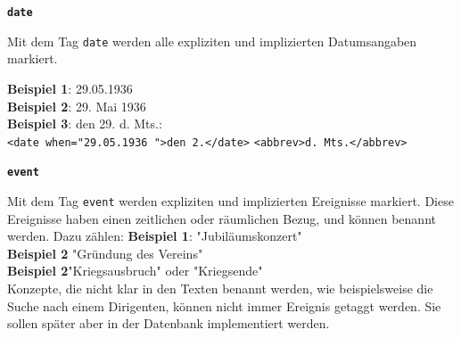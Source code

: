 \documentclass[12pt, a4paper, ngerman, bidi=default]{article}
\begin{document}
\begin{description}
    \item \textbf{\colorbox{date}{\texttt{date}}}
        
    Mit dem Tag \texttt{\colorbox{date}{date}} werden alle expliziten und implizierten Datumsangaben markiert.  
    
    \noindent \textbf{ Beispiel 1}:  29.05.1936  \\
    \textbf{ Beispiel 2}: 29. Mai 1936 \\
    \textbf{ Beispiel 3}: den 29. d. Mts.:\\
    \colorbox{VeryLightGray}{\texttt{\textless date when="29.05.1936 "\textgreater den 2.\textless /date\textgreater} \texttt{\textless abbrev\textgreater d. Mts.\textless /abbrev\textgreater}}

    \item \textbf{\colorbox{eventTag}{\texttt{event}}}
    
    Mit dem Tag \texttt{\colorbox{eventTag}{event}} werden expliziten und implizierten Ereignisse markiert. Diese Ereignisse haben einen zeitlichen oder räumlichen Bezug, und können benannt werden. Dazu zählen:
    \noindent \textbf{ Beispiel 1}: "Jubiläumskonzert"\\
    \textbf{ Beispiel 2} "Gründung des Vereins" \\ 
    \textbf{ Beispiel 2}"Kriegsausbruch" oder "Kriegsende"\\

    Konzepte, die nicht klar in den Texten benannt werden, wie beispielsweise die Suche nach einem Dirigenten, können nicht immer Ereignis getaggt werden. Sie sollen später aber in der Datenbank implementiert werden.
    \end{description}
    
\end{document}
